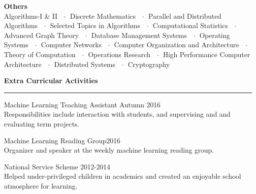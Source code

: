 \documentclass[10pt]{article}
\newcommand{\heading}[1]{
 {\large \textbf{#1}}
  \vspace{0.4em}
  \hrule
  \vspace{0.4em}
}
\newcommand{\EntryGap}{\vspace{0.5cm}}
\newcommand{\SmallEntryGap}{\vspace{0.2cm}}
\newcommand{\mdot}{$\ \ \cdot\ \ $}
\begin{document}
\SmallEntryGap
\textbf{Others}\\
Algorithms-I \& II \mdot Discrete Mathematics \mdot Parallel and Distributed Algorithms 
\mdot Selected Topics in Algorithms  \mdot Computational Statistics
\mdot Advanced Graph Theory \mdot Database Management Systems \mdot Operating Systems
\mdot Computer Networks \mdot Computer Organization and Architecture \mdot Theory of Computation
\mdot Operations Research \mdot High Performance Computer Architecture \mdot Distributed Systems
\mdot Cryptography

\EntryGap
\heading{Extra Curricular Activities}
\SmallEntryGap
Machine Learning Teaching Assistant \hfill Autumn 2016\\
Responsibilities include interaction with students, and supervising and
and evaluating term projects.

\SmallEntryGap
Machine Learning Reading Group\hfill 2016\\
Organizer and speaker at the weekly machine learning reading group.

\SmallEntryGap
National Service Scheme \hfill 2012-2014\\
Helped under-privileged children in academics and created an enjoyable school 
atmosphere for learning.
\end{document}
